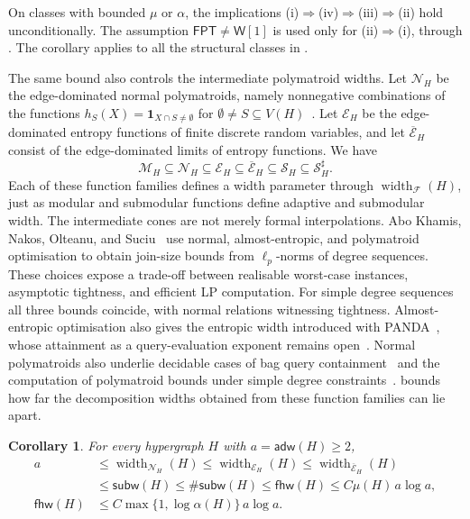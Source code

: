 \documentclass[11pt,letterpaper]{article}
\newtheorem{corollary}[corollary]{Corollary}
\theoremstyle{definition}
\theoremstyle{remark}
\newcommand{\fhw}{\mathsf{fhw}}
\newcommand{\adw}{\mathsf{adw}}
\newcommand{\subw}{\mathsf{subw}}
\newcommand{\sharpsubw}{\mathsf{\#subw}}
\newcommand{\FPT}{\ensuremath{\mathsf{FPT}}}
\newcommand{\wone}{\ensuremath{\mathsf{W}[1]}}
\providecommand{\adw}{\operatorname{adw}}
\providecommand{\subw}{\operatorname{subw}}
\providecommand{\fhw}{\operatorname{fhw}}
\providecommand{\FPT}{\ensuremath{\mathsf{FPT}}}
\begin{document}
On classes with bounded $\mu$ or $\alpha$, the implications
(i)$\Rightarrow$(iv)$\Rightarrow$(iii)$\Rightarrow$(ii) hold unconditionally. The assumption $\FPT\ne \wone$ is used only for (ii)$\Rightarrow$(i), through . The corollary applies to all the structural classes in .


%

The same bound also controls the intermediate polymatroid widths.
Let $\mathcal N_H$ be the edge-dominated normal polymatroids, namely
nonnegative combinations of the functions
$h_S(X)=\mathbf 1_{X\cap S\ne\emptyset}$ for
$\emptyset\ne S\subseteq V(H)$~\cite{KhamisEtAl2020BagContainment}.
Let $\mathcal E_H$ be the edge-dominated entropy functions of finite
discrete random variables, and let $\overline{\mathcal E}_H$ consist
of the edge-dominated limits of entropy functions. We have
\[
 \mathcal M_H\subseteq\mathcal N_H\subseteq\mathcal E_H
 \subseteq\overline{\mathcal E}_H\subseteq\mathcal S_H
 \subseteq\mathcal S_H^\sharp.
\]
Each of these function families defines a width parameter through
$\operatorname{width}_{\mathcal F}(H)$, just as modular and submodular
functions define adaptive and submodular width.
The intermediate cones are not merely formal interpolations. Abo Khamis,
Nakos, Olteanu, and Suciu~\cite{KhamisEtAl2024LpBounds} use normal, almost-entropic, and
polymatroid optimisation to obtain join-size bounds from $\ell_p$-norms
of degree sequences. These choices expose a trade-off between realisable
worst-case instances, asymptotic tightness, and efficient LP computation.
For simple degree sequences all three bounds coincide, with normal
relations witnessing tightness. Almost-entropic optimisation also gives
the entropic width introduced with PANDA~\cite{pandaexpress,KhamisNgoSuciu2026PANDAExpress}, whose
attainment as a query-evaluation exponent remains open~\cite{jaguar}.
Normal polymatroids also underlie decidable cases of bag query
containment~\cite{KhamisEtAl2020BagContainment} and the computation of
polymatroid bounds under simple degree
constraints~\cite{ImEtAl2025SimpleDegree}.
 bounds how far the decomposition widths obtained from
these function families can lie apart.

\begin{corollary}
\label{cor:width-hierarchy-band}
For every hypergraph $H$ with $a=\adw(H) \ge 2$,
\begin{equation}
\begin{aligned}
 a
 &\le\operatorname{width}_{\mathcal N_H}(H)
 \le\operatorname{width}_{\mathcal E_H}(H)
 \le\operatorname{width}_{\overline{\mathcal E}_H}(H)\\
 &\le\subw(H)\le\sharpsubw(H)\le\fhw(H)
 \le C\mu(H)\, a\log a,\\
 \fhw(H)&\le C\max\{1,\log\alpha(H)\}\, a\log a.
\end{aligned}
\label{eq:width-hierarchy-band}
\end{equation}
\end{corollary}
\end{document}
